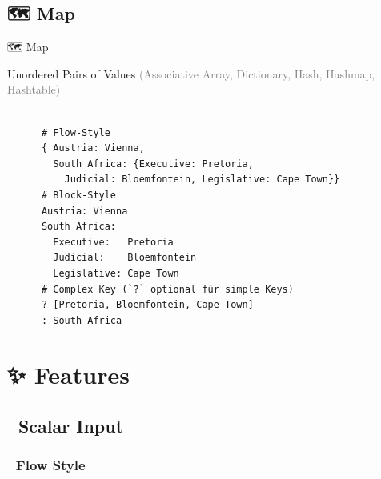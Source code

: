 \documentclass{beamer}
\begin{document}
\subsection{🗺 Map}

\begin{frame}[fragile]{🗺 Map}
  \begin{block}{Unordered Pairs of Values}
    \textcolor{gray}{(Associative Array, Dictionary, Hash, Hashmap, Hashtable)}\\\\
    \begin{verbatim}
      # Flow-Style
      { Austria: Vienna,
        South Africa: {Executive: Pretoria,
          Judicial: Bloemfontein, Legislative: Cape Town}}
      # Block-Style
      Austria: Vienna
      South Africa:
        Executive:   Pretoria
        Judicial:    Bloemfontein
        Legislative: Cape Town
      # Complex Key (`?` optional für simple Keys)
      ? [Pretoria, Bloemfontein, Cape Town]
      : South Africa
    \end{verbatim}
  \end{block}
\end{frame}

\section{✨ Features}
\subsection{📝 Scalar Input}

\subsubsection{🌊 Flow Style}
\end{document}
